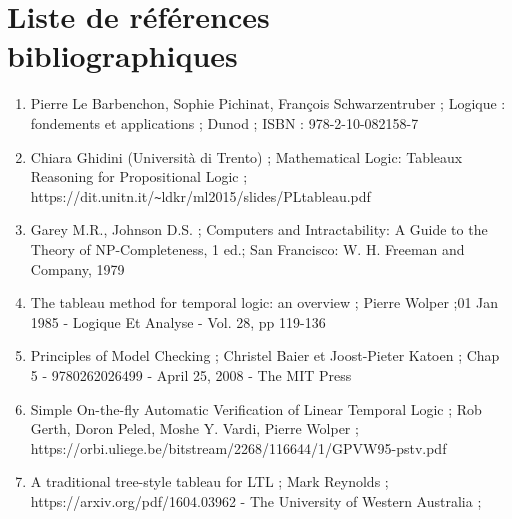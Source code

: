 \documentclass{paper}
\begin{document}
\section{Liste de références bibliographiques} 
\begin{enumerate} 
    \item Pierre Le Barbenchon, Sophie Pichinat, François Schwarzentruber ; Logique : fondements et applications ; Dunod ; ISBN : 978-2-10-082158-7 
    \item Chiara Ghidini (Università di Trento) ; Mathematical Logic: Tableaux Reasoning for Propositional Logic ; https://dit.unitn.it/\verb|~|ldkr/ml2015/slides/PLtableau.pdf 
    \item Garey M.R., Johnson D.S. ; Computers and Intractability: A Guide to the Theory of NP-Completeness, 1 ed.; San Francisco: W. H. Freeman and Company, 1979 
    \item The tableau method for temporal logic: an overview ; Pierre Wolper ;01 Jan 1985 - Logique Et Analyse - Vol. 28, pp 119-136 
    \item Principles of Model Checking ; Christel Baier et Joost-Pieter Katoen ; Chap 5 - 9780262026499 - April 25, 2008 - The MIT Press 
    \item Simple On-the-fly Automatic Verification of Linear Temporal Logic ; Rob Gerth, Doron Peled, Moshe Y. Vardi, Pierre Wolper ; https://orbi.uliege.be/bitstream/2268/116644/1/GPVW95-pstv.pdf 
    \item A traditional tree-style tableau for LTL ; Mark Reynolds ; https://arxiv.org/pdf/1604.03962 - The University of Western Australia ;
\end{enumerate}
\end{document}
